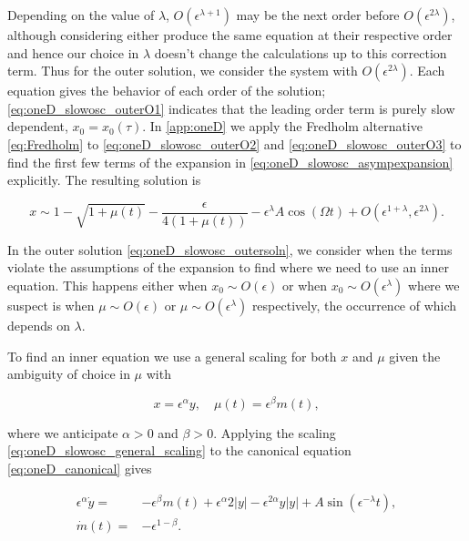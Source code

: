 Depending on the value of $\lambda$, $O(\epsilon^{\lambda+1})$ may be the next order before $O(\epsilon^{2\lambda})$, although considering either produce the same equation at their respective order and hence our choice in $\lambda$ doesn't change the calculations up to this correction term. Thus for the outer solution, we consider the system with $O(\epsilon^{2\lambda})$. Each equation gives the behavior of each order of the solution; \eqref{eq:oneD_slowosc_outerO1} indicates that the leading order term is purely slow dependent, $x_0=x_0(\tau)$. In \autoref{app:oneD} we apply the Fredholm alternative \eqref{eq:Fredholm} to \eqref{eq:oneD_slowosc_outerO2} and \eqref{eq:oneD_slowosc_outerO3} to find the first few terms of the expansion in \eqref{eq:oneD_slowosc_asympexpansion} explicitly. The resulting solution is

\begin{equation}\label{eq:oneD_slowosc_outersoln}
x\sim 1-\sqrt{1+\mu(t)}-\frac{\epsilon}{4(1+\mu(t))}-\epsilon^\lambda A \cos(\Omega t)+O(\epsilon^{1+\lambda},\epsilon^{2\lambda}).
\end{equation}

In the outer solution \eqref{eq:oneD_slowosc_outersoln}, we consider when the terms violate the assumptions of the expansion to find where we need to use an inner equation. This happens either when $x_0\sim O(\epsilon)$ or when $x_0\sim O(\epsilon^\lambda)$ where we suspect is when $\mu\sim O(\epsilon)$ or $\mu\sim O(\epsilon^\lambda)$ respectively, the occurrence of which depends on $\lambda$. 

To find an inner equation we use a general scaling for both $x$ and $\mu$ given the ambiguity of choice in $\mu$ with

\begin{equation}\label{eq:oneD_slowosc_general_scaling}
x=\epsilon^\alpha y ,\quad \mu(t)=\epsilon^\beta m(t),
\end{equation}

where we anticipate $\alpha>0$ and $\beta>0$. Applying the scaling \eqref{eq:oneD_slowosc_general_scaling} to the canonical equation \eqref{eq:oneD_canonical} gives

\begin{equation}\label{eq:oneD_slowosc_innerscaled}
\begin{aligned}
\epsilon^\alpha \dot{y}=& -\epsilon^\beta m(t)+\epsilon^\alpha 2|y| - \epsilon^{2\alpha}y|y| +A\sin(\epsilon^{-\lambda}t),\\
\dot{m}(t)=&-\epsilon^{1-\beta}.
\end{aligned}
\end{equation}

